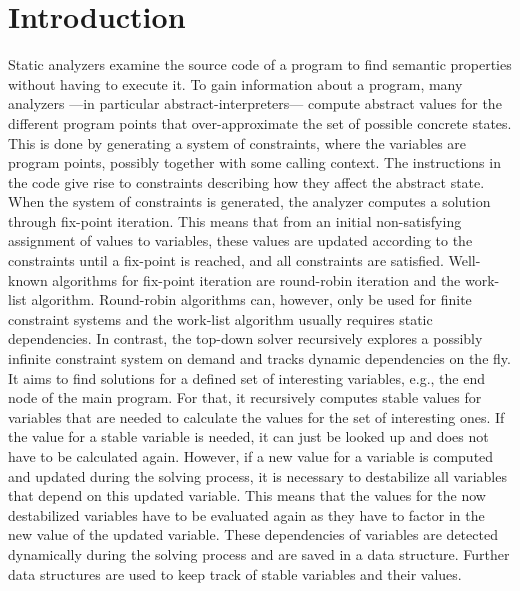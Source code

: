 \section{Introduction}
\label{sec:introduction}
Static analyzers examine the source code of a program to find semantic properties without having to execute it. To gain information about a program, many analyzers ---in particular abstract-interpreters--- compute abstract values for the different program points that over-approximate the set of possible concrete states. This is done by generating a system of constraints, where the variables are program points, possibly together with some calling context. The instructions in the code give rise to constraints describing how they affect the abstract state. When the system of constraints is generated, the analyzer computes a solution through fix-point iteration. This means that from an initial non-satisfying assignment of values to variables, these values are updated according to the constraints until a fix-point is reached, and all constraints are satisfied. Well-known algorithms for fix-point iteration are round-robin iteration and the work-list algorithm. Round-robin algorithms can, however, only be used for finite constraint systems and the work-list algorithm usually requires static dependencies. In contrast, the top-down solver recursively explores a possibly infinite constraint system on demand and tracks dynamic dependencies on the fly. It aims to find solutions for a defined set of interesting variables, e.g., the end node of the main program. For that, it recursively computes stable values for variables that are needed to calculate the values for the set of interesting ones. If the value for a stable variable is needed, it can just be looked up and does not have to be calculated again. However, if a new value for a variable is computed and updated during the solving process, it is necessary to destabilize all variables that depend on this updated variable. This means that the values for the now destabilized variables have to be evaluated again as they have to factor in the new value of the updated variable. These dependencies of variables are detected dynamically during the solving process and are saved in a data structure. Further data structures are used to keep track of stable variables and their values. 
